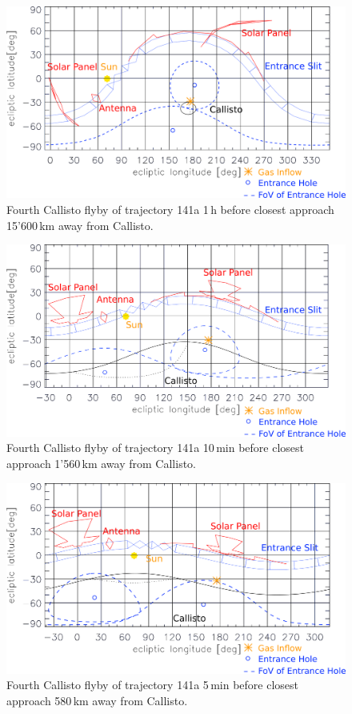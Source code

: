 		\begin{figure}[h!]
			\centering
			\includegraphics[width = .7\textwidth]{Bilder/NIM_pointing_2031JAN15185200.png}
			\caption{Fourth Callisto flyby of trajectory 141a \cite{SOC_Crema3p2} 1\,h before closest approach 15'600\,km away from Callisto.}
			\label{fig:FlybyCal1852}
		\end{figure}
		\begin{figure}[h!]
			\centering
			\includegraphics[width = .7\textwidth]{Bilder/NIM_pointing_2031JAN15194200.png}
			\caption{Fourth Callisto flyby of trajectory 141a \cite{SOC_Crema3p2} 10\,min before closest approach 1'560\,km away from Callisto.}
			\label{fig:FlybyCal1942}
		\end{figure}
		\begin{figure}[h!]
			\centering
			\includegraphics[width = .7\textwidth]{Bilder/NIM_pointing_2031JAN15194700.png}
			\caption{Fourth Callisto flyby of trajectory 141a \cite{SOC_Crema3p2} 5\,min before closest approach 580\,km away from Callisto.}
			\label{fig:FlybyCal1947}
		\end{figure}
